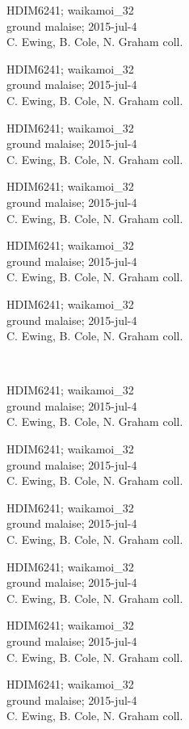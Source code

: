 \documentclass[2pt]{extarticle}
\begin{document}
\noindent
\parbox{0.16\textwidth}{\tiny \raggedright \rule[-0.3\baselineskip]{0pt}{10pt}HDIM6241; waikamoi\_32\\ ground malaise; 2015-jul-4\\ C. Ewing, B. Cole, N. Graham coll.}
\parbox{0.16\textwidth}{\tiny \raggedright \rule[-0.3\baselineskip]{0pt}{10pt}HDIM6241; waikamoi\_32\\ ground malaise; 2015-jul-4\\ C. Ewing, B. Cole, N. Graham coll.}
\parbox{0.16\textwidth}{\tiny \raggedright \rule[-0.3\baselineskip]{0pt}{10pt}HDIM6241; waikamoi\_32\\ ground malaise; 2015-jul-4\\ C. Ewing, B. Cole, N. Graham coll.}
\parbox{0.16\textwidth}{\tiny \raggedright \rule[-0.3\baselineskip]{0pt}{10pt}HDIM6241; waikamoi\_32\\ ground malaise; 2015-jul-4\\ C. Ewing, B. Cole, N. Graham coll.}
\parbox{0.16\textwidth}{\tiny \raggedright \rule[-0.3\baselineskip]{0pt}{10pt}HDIM6241; waikamoi\_32\\ ground malaise; 2015-jul-4\\ C. Ewing, B. Cole, N. Graham coll.}
\parbox{0.16\textwidth}{\tiny \raggedright \rule[-0.3\baselineskip]{0pt}{10pt}HDIM6241; waikamoi\_32\\ ground malaise; 2015-jul-4\\ C. Ewing, B. Cole, N. Graham coll.} \\ 
\vspace{0.001in} 

\noindent
\parbox{0.16\textwidth}{\tiny \raggedright \rule[-0.3\baselineskip]{0pt}{10pt}HDIM6241; waikamoi\_32\\ ground malaise; 2015-jul-4\\ C. Ewing, B. Cole, N. Graham coll.}
\parbox{0.16\textwidth}{\tiny \raggedright \rule[-0.3\baselineskip]{0pt}{10pt}HDIM6241; waikamoi\_32\\ ground malaise; 2015-jul-4\\ C. Ewing, B. Cole, N. Graham coll.}
\parbox{0.16\textwidth}{\tiny \raggedright \rule[-0.3\baselineskip]{0pt}{10pt}HDIM6241; waikamoi\_32\\ ground malaise; 2015-jul-4\\ C. Ewing, B. Cole, N. Graham coll.}
\parbox{0.16\textwidth}{\tiny \raggedright \rule[-0.3\baselineskip]{0pt}{10pt}HDIM6241; waikamoi\_32\\ ground malaise; 2015-jul-4\\ C. Ewing, B. Cole, N. Graham coll.}
\parbox{0.16\textwidth}{\tiny \raggedright \rule[-0.3\baselineskip]{0pt}{10pt}HDIM6241; waikamoi\_32\\ ground malaise; 2015-jul-4\\ C. Ewing, B. Cole, N. Graham coll.}
\parbox{0.16\textwidth}{\tiny \raggedright \rule[-0.3\baselineskip]{0pt}{10pt}HDIM6241; waikamoi\_32\\ ground malaise; 2015-jul-4\\ C. Ewing, B. Cole, N. Graham coll.} \\ 
\vspace{0.001in} 
\end{document}
